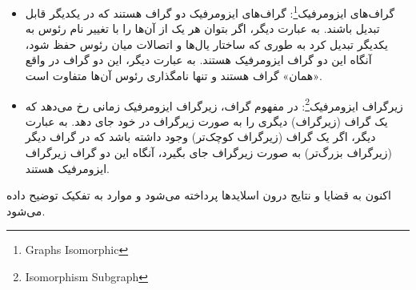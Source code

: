 \documentclass[a4paper,10pt]{article}
\begin{document}
\begin{itemize}
        \item گراف‌های ایزومرفیک\footnote{\hspace{2pt}Graphs Isomorphic}: گراف‌های ایزومرفیک دو گراف هستند که در یکدیگر قابل تبدیل باشند. به عبارت دیگر، اگر بتوان هر یک از آن‌ها را با تغییر نام رئوس به یکدیگر تبدیل کرد به طوری که ساختار یال‌ها و اتصالات میان رئوس حفظ شود، آنگاه این دو گراف ایزومرفیک هستند. به عبارت دیگر، این دو گراف در واقع «همان» گراف هستند و تنها نامگذاری رئوس آن‌ها متفاوت است.
        
        \item زیرگراف ایزومرفیک\footnote{\hspace{2pt}Isomorphism Subgraph}: در مفهوم گراف، زیرگراف ایزومرفیک زمانی رخ می‌دهد که یک گراف (زیرگراف) دیگری را به صورت زیرگراف در خود جای دهد. به عبارت دیگر، اگر یک گراف (زیرگراف کوچک‌تر) وجود داشته باشد که در گراف دیگر (زیرگراف بزرگ‌تر) به صورت زیرگراف جای بگیرد، آنگاه این دو گراف زیرگراف ایزومرفیک هستند.

    \end{itemize}

    اکنون به قضایا و نتایج درون اسلایدها پرداخته می‌شود و موارد به تفکیک توضیح داده می‌شود.
\end{document}
